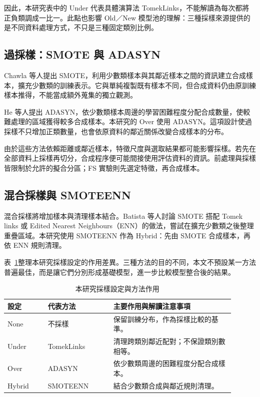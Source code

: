 因此，本研究表中的 Under 代表具體演算法 TomekLinks，不能解讀為每次都將正負類調成一比一。此點也影響 Old／New 模型池的理解：三種採樣來源提供的是不同資料處理方式，不只是三種固定類別比例。

\subsection{過採樣：SMOTE 與 ADASYN}

Chawla 等人\autocite{chawla2002smote}提出 SMOTE，利用少數類樣本與其鄰近樣本之間的資訊建立合成樣本，擴充少數類的訓練表示。它與單純複製既有樣本不同，但合成資料仍由原訓練樣本推得，不能當成額外蒐集的獨立觀測。

He 等人\autocite{he2008adasyn}提出 ADASYN，依少數類樣本周邊的學習困難程度分配合成數量，使較難處理的區域獲得較多合成樣本。本研究的 Over 使用 ADASYN。這項設計使過採樣不只增加正類數量，也會依原資料的鄰近關係改變合成樣本的分布。

由於這些方法依賴距離或鄰近樣本，特徵尺度與選取結果都可能影響採樣。若先在全部資料上採樣再切分，合成程序便可能間接使用評估資料的資訊。前處理與採樣皆限制於允許的擬合分區；FS 實驗則先選定特徵，再合成樣本。

\subsection{混合採樣與 SMOTEENN}

混合採樣將增加樣本與清理樣本結合。Batista 等人\autocite{batista2004balancing}討論 SMOTE 搭配 Tomek links 或 Edited Nearest Neighbours（ENN）的做法，嘗試在擴充少數類之後整理重疊區域。本研究使用 SMOTEENN 作為 Hybrid：先由 SMOTE 合成樣本，再依 ENN 規則清理。

表~\ref{tab:lit-sampling}整理本研究採樣設定的作用差異。三種方法的目的不同，本文不預設某一方法普遍最佳，而是讓它們分別形成基礎模型，進一步比較模型整合後的結果。

\begin{table}[htbp]
\centering\small
{}\setlength{\tabcolsep}{4pt}
\caption{本研究採樣設定與方法作用}\label{tab:lit-sampling}
\begin{tabular}{@{}>{\raggedright\arraybackslash}p{0.16\linewidth}>{\raggedright\arraybackslash}p{0.26\linewidth}>{\raggedright\arraybackslash}p{0.48\linewidth}@{}}
\toprule
設定 & 代表方法 & 主要作用與解讀注意事項 \\
\midrule
None & 不採樣 & 保留訓練分布，作為採樣比較的基準。 \\[4pt]
Under & TomekLinks & 清理跨類別鄰近配對；不保證類別數相等。 \\[4pt]
Over & ADASYN & 依少數類周邊的困難程度分配合成樣本。 \\[4pt]
Hybrid & SMOTEENN & 結合少數類合成與鄰近規則清理。 \\
\bottomrule
\end{tabular}
\par{}
\end{table}

